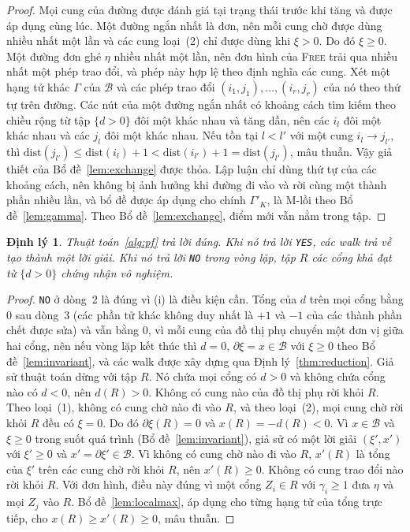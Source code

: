 \documentclass[pdflatex,sn-mathphys-num]{sn-jnl}
\theoremstyle{thmstyleone}
\newtheorem{theorem}{Định lý}
\theoremstyle{thmstyletwo}
\theoremstyle{thmstylethree}
\newcommand{\cB}{\mathcal{B}}
\newcommand{\FREE}{\textup{\textsc{Free}}}
\newcommand{\YES}{\texttt{YES}}
\newcommand{\NO}{\texttt{NO}}
\begin{document}
\begin{proof}
Mọi cung của đường được đánh giá tại trạng thái trước khi tăng và được áp dụng cùng lúc. Một đường ngắn nhất là đơn, nên mỗi cung chờ được dùng nhiều nhất một lần và các cung loại~(2) chỉ được dùng khi $\xi>0$. Do đó $\xi\ge0$. Một đường đơn ghé $\eta$ nhiều nhất một lần, nên đơn hình của \FREE{} trải qua nhiều nhất một phép trao đổi, và phép này hợp lệ theo định nghĩa các cung. Xét một hạng tử khác $\Gamma$ của $\cB$ và các phép trao đổi $(i_1,j_1),\dots,(i_r,j_r)$ của nó theo thứ tự trên đường. Các nút của một đường ngắn nhất có khoảng cách tìm kiếm theo chiều rộng từ tập $\{d>0\}$ đôi một khác nhau và tăng dần, nên các $i_l$ đôi một khác nhau và các $j_l$ đôi một khác nhau. Nếu tồn tại $l<l'$ với một cung $i_l\to j_{l'}$, thì $\mathrm{dist}(j_{l'})\le\mathrm{dist}(i_l)+1<\mathrm{dist}(i_{l'})+1=\mathrm{dist}(j_{l'})$, mâu thuẫn. Vậy giả thiết của Bổ đề~\ref{lem:exchange} được thỏa. Lập luận chỉ dùng thứ tự của các khoảng cách, nên không bị ảnh hưởng khi đường đi vào và rời cùng một thành phần nhiều lần, và bổ đề được áp dụng cho chính $\Gamma'_K$, là M-lồi theo Bổ đề~\ref{lem:gamma}. Theo Bổ đề~\ref{lem:exchange}, điểm mới vẫn nằm trong tập.
\end{proof}

\begin{theorem}\label{thm:correct}
Thuật toán~\ref{alg:pf} trả lời đúng. Khi nó trả lời \YES{}, các walk trả về tạo thành một lời giải. Khi nó trả lời \NO{} trong vòng lặp, tập $R$ các cổng khả đạt từ $\{d>0\}$ chứng nhận vô nghiệm.
\end{theorem}

\begin{proof}
\NO{} ở dòng~2 là đúng vì (i) là điều kiện cần. Tổng của $d$ trên mọi cổng bằng $0$ sau dòng~3 (các phần tử khác không duy nhất là $+1$ và $-1$ của các thành phần chết được sửa) và vẫn bằng $0$, vì mỗi cung của đồ thị phụ chuyển một đơn vị giữa hai cổng, nên nếu vòng lặp kết thúc thì $d=0$, $\partial\xi=x\in\cB$ với $\xi\ge0$ theo Bổ đề~\ref{lem:invariant}, và các walk được xây dựng qua Định lý~\ref{thm:reduction}. Giả sử thuật toán dừng với tập $R$. Nó chứa mọi cổng có $d>0$ và không chứa cổng nào có $d<0$, nên $d(R)>0$. Không có cung nào của đồ thị phụ rời khỏi $R$. Theo loại~(1), không có cung chờ nào đi vào $R$, và theo loại~(2), mọi cung chờ rời khỏi $R$ đều có $\xi=0$. Do đó $\partial\xi(R)=0$ và $x(R)=-d(R)<0$. Vì $x\in\cB$ và $\xi\ge0$ trong suốt quá trình (Bổ đề~\ref{lem:invariant}), giả sử có một lời giải $(\xi',x')$ với $\xi'\ge0$ và $x'=\partial\xi'\in\cB$. Vì không có cung chờ nào đi vào $R$, $x'(R)$ là tổng của $\xi'$ trên các cung chờ rời khỏi $R$, nên $x'(R)\ge0$. Không có cung trao đổi nào rời khỏi $R$. Với đơn hình, điều này đúng vì một cổng $Z_i\in R$ với $\gamma_i\ge1$ đưa $\eta$ và mọi $Z_j$ vào $R$. Bổ đề~\ref{lem:localmax}, áp dụng cho từng hạng tử của tổng trực tiếp, cho $x(R)\ge x'(R)\ge0$, mâu thuẫn.
\end{proof}
\end{document}
